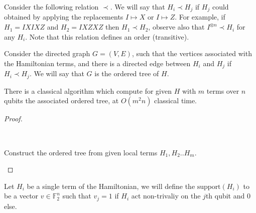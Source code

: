 \documentclass{article}
\begin{document}
\begin{definition}
  Consider the following relation $\prec$. We will say that $H_{i} \prec H_{j}$ if $H_{j}$ could obtained by applying the replacements $I \mapsto X  $ or $ I \mapsto Z$. For example, if $H_{1} = IXIXZ$ and $H_{2}=IXZXZ$ then $H_{1}\prec H_{2}$, observe also that $I^{\otimes n} \prec H_{i}$ for any $H_{i}$. Note that this relation defines an order (transitive). 
\end{definition}
\begin{definition} 
  Consider the directed graph $G=\left( V,E \right)$, such that the vertices associated with the Hamiltonian terms, and there is a directed edge between $H_{i}$ and $H_{j}$ if $H_{i} \prec H_{j}$. We will say that $G$ is the ordered tree of $H$. 
\end{definition}

\begin{lemma}
  There is a classical algorithm which compute for given $H$ with $m$ terms over $n$ qubits the associated ordered tree, at $O\left( m^{2}n \right)$ classical time.  
\end{lemma}
\begin{proof}
\begin{algorithm}[H]
	\SetAlgoLined
	\ \\ 
	\caption{Construct the ordered tree from given local terms $H_{1}, H_{2} .. H_{m}$.}
      \end{algorithm}
    \end{proof}
\begin{definition}
  Let \(H_{i}\) be a single term of the Hamiltonian, we will define the \( \text{support}(H_{i}) \) to be a vector \( v \in \mathbb{F}^{n}_2\) such that \(v_j = 1\) if \(H_{i}\) act non-trivaliy on the \(j\)th qubit and \(0\) else.
\end{definition}
\end{document}
